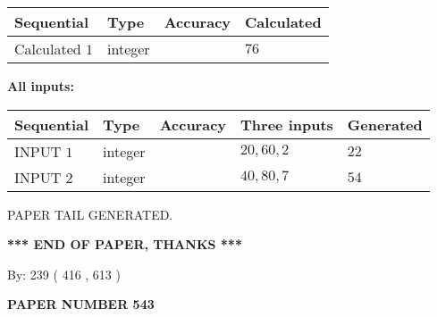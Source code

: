 \documentclass[12pt]{article}
\begin{document}
   
  
  
\noindent\begin{tabular}{|l|l|l|l|}
\hline
 Sequential & Type & Accuracy & Calculated \\ 
\hline
 
 
  Calculated $  1 $ & integer &  & 
  $ 76 $ 
 \\  \hline  
 \end{tabular}
   
   
   
   
\noindent\vspace{0.1in}\hspace{-0.08in} {\textbf{\Large{All inputs: }}}
   
   
  
  
\noindent\begin{tabular}{|l|l|l|l|l|}
\hline
 Sequential & Type & Accuracy & Three inputs & Generated \\ 
\hline
 
 
  INPUT $  1 $ & integer &  & $
 20
 , 
 60
 , 
 2
 $ & $ 22 $ 
 \\  \hline  
 
 
  INPUT $  2 $ & integer &  & $
 40
 , 
 80
 , 
 7
 $ & $ 54 $ 
 \\  \hline  
 \end{tabular}
   
   
   
   
   
   
 \vspace{0.2in}
 
   
   
\vspace{2.0in} PAPER TAIL GENERATED.
   
   
   
   
\vspace{1.0in} 
{\textbf{\large{ *** END OF PAPER, THANKS *** }}} 
   
   
\hspace{1.0in} By: 
 239 ( 416 ,  613 )
   
   
   
   
\newpage 
\setcounter{page}{ 
   543001 } 
   
   
   
   
 {\textbf{ \Large{ PAPER NUMBER  543  }}}
   
   
\vspace{0.2in}
   
   
   
\end{document}
